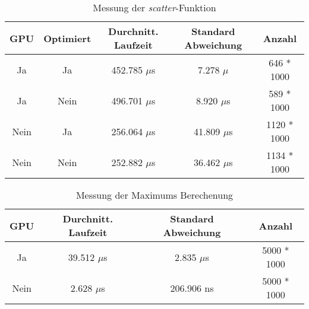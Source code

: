 \begin{table}[h!]
\centering
\begin{tabular}{c|c|c|c|c} 
     GPU & Optimiert & Durchnitt. Laufzeit & Standard Abweichung & Anzahl \\
     \hline
     Ja & Ja     & 452.785 $\mu$s  & 7.278  $\mu$   & 646 * 1000\\
     Ja & Nein   & 496.701 $\mu$s  & 8.920  $\mu$s  &  589 * 1000\\
     Nein & Ja   & 256.064 $\mu$s  & 41.809 $\mu$s  & 1120 * 1000\\
     Nein & Nein & 252.882 $\mu$s  & 36.462 $\mu$s  & 1134 * 1000\\
\end{tabular}
\caption{Messung der \textit{scatter}-Funktion}
\label{table:Scatter}
\end{table}

\begin{table}[h!] 
\centering
\begin{tabular}{c|c|c|c}
     GPU & Durchnitt. Laufzeit & Standard Abweichung & Anzahl \\
     \hline
     Ja     & 39.512 $\mu$s  & 2.835 $\mu$s & 5000 * 1000 \\
     Nein   & 2.628  $\mu$s  &  206.906 ns & 5000 * 1000 \\
\end{tabular}
\caption{Messung der Maximums Berechenung}
\label{table:Maximum}
\end{table}

